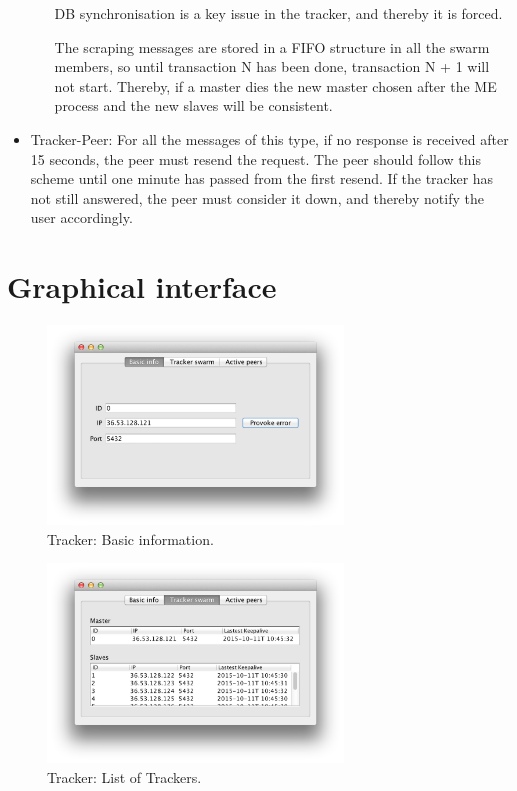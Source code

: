 \documentclass[twoside,a4paper,10pt]{article}
\begin{document}
\begin{itemize}
\begin{enumerate}
    DB synchronisation is a key issue in the tracker, and thereby it is forced.

    The scraping messages are stored in a FIFO structure in all the swarm
    members, so until transaction N has been done, transaction N + 1 will not
    start. Thereby, if a master dies the new master chosen after the ME process
    and the new slaves will be consistent.
    
  \end{enumerate}
\item Tracker-Peer: For all the messages of this type, if no response is
  received after 15 seconds, the peer must resend the request. The peer should
  follow this scheme until one minute has passed from the first resend. If the
  tracker has not still answered, the peer must consider it down,
  and thereby notify the user accordingly.
\end{itemize}

\section{Graphical interface}

\begin{figure}[!htp]
  \centering
  \includegraphics[width=0.7\textwidth]{imgs/tracker/basicInfo.png}
  \caption{\label{fig:basicInfo}Tracker: Basic information.}
\end{figure}

\begin{figure}[!htp]
  \centering
  \includegraphics[width=0.7\textwidth]{imgs/tracker/trakerSwarm.png}
  \caption{\label{fig:trackerSwarm}Tracker: List of Trackers.}
\end{figure}



\end{document}
